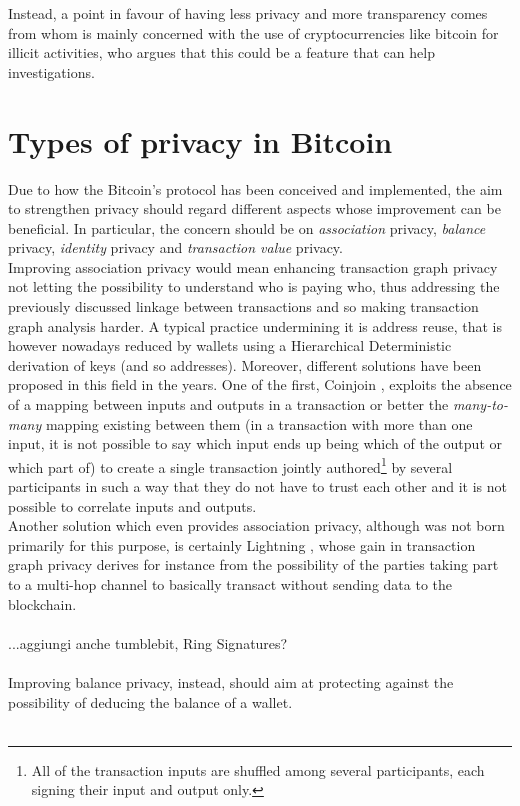 Instead, a point in favour of having less privacy and more transparency comes from whom is mainly concerned with the use of cryptocurrencies like bitcoin for illicit activities, who argues that this could be a feature that can help investigations.
\section{Types of privacy in Bitcoin}
Due to how the Bitcoin's protocol has been conceived and implemented, the aim to strengthen privacy should regard different aspects whose improvement can be beneficial. In particular, the concern should be on \textit{association} privacy, \textit{balance} privacy, \textit{identity} privacy and \textit{transaction value} privacy.\\
Improving association privacy would mean enhancing transaction graph privacy not letting the possibility to understand who is paying who, thus addressing the previously discussed linkage between transactions and so making transaction graph analysis harder. A typical practice undermining it is address reuse, that is however nowadays reduced by wallets using a Hierarchical Deterministic derivation of keys (and so addresses). Moreover, different solutions have been proposed in this field in the years. One of the first, Coinjoin \cite{Max13}, exploits the absence of a mapping between inputs and outputs in a transaction or better the \textit{many-to-many} mapping existing between them (in a transaction with more than one input, it is not possible to say which input ends up being which of the output or which part of) to create a single transaction jointly authored\footnote{All of the transaction inputs are shuffled among several participants, each signing their input and output only.} by several participants in such a way that they do not have to trust each other and it is not possible to correlate inputs and outputs.\\ Another solution which even provides association privacy, although was not born primarily for this purpose, is certainly Lightning \cite{RefWork:18}, whose gain in transaction graph privacy derives for instance from the possibility of the parties taking part to a multi-hop channel to basically transact without sending data to the blockchain. \\ \ \\
...aggiungi anche tumblebit, Ring Signatures?\\ \ \\
Improving balance privacy, instead, should aim at protecting against the possibility of deducing the balance of a wallet. \\ \ \\
